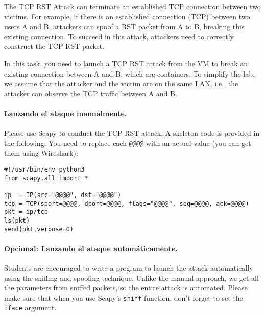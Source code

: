 The TCP RST Attack can terminate an established TCP connection between
two victims. For example, if there is an established \telnet connection (TCP)
between two users A and B, attackers can spoof a RST packet from A to B,
breaking this existing connection. To succeed in this attack, attackers
need to correctly construct the TCP RST packet. 

In this task, you need to launch a TCP RST attack from the VM 
to break an existing \telnet connection between A and B, which are 
containers.  To simplify the lab,
we assume that the attacker and the victim are on the same LAN,
i.e., the attacker can observe the TCP traffic between
A and B.


\paragraph{Lanzando el ataque manualmente.} 
Please use Scapy to conduct the TCP RST attack. 
A skeleton code is provided in the following. You need to replace each
\texttt{@@@@} with an actual value (you can get them using Wireshark):  


\begin{lstlisting}
#!/usr/bin/env python3
from scapy.all import *

ip  = IP(src="@@@@", dst="@@@@")
tcp = TCP(sport=@@@@, dport=@@@@, flags="@@@@", seq=@@@@, ack=@@@@)
pkt = ip/tcp
ls(pkt)
send(pkt,verbose=0)
\end{lstlisting}

\paragraph{Opcional: Lanzando el ataque automáticamente.} 
Students are encouraged to write a program to launch the 
attack automatically using the sniffing-and-spoofing technique. 
Unlike the manual approach, we get all the parameters
from sniffed packets, so the entire attack is automated.  
Please make sure that when you 
use Scapy's \texttt{sniff} function, don't forget to 
set the \texttt{iface} argument.  

 

